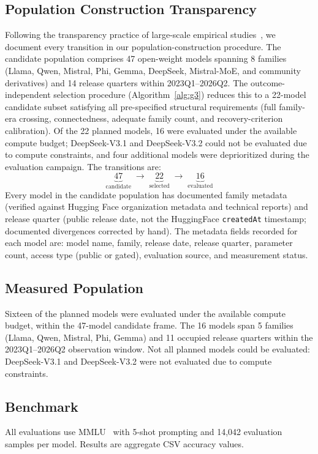 \documentclass{ieeeaccess}
\theoremstyle{definition}
\theoremstyle{plain}
\begin{document}
\subsection{Population Construction Transparency}
Following the transparency practice of large-scale empirical studies~\cite{kim2025}, we document every transition in our population-construction procedure. The candidate population comprises 47 open-weight models spanning 8 families (Llama, Qwen, Mistral, Phi, Gemma, DeepSeek, Mistral-MoE, and community derivatives) and 14 release quarters within 2023Q1--2026Q2. The outcome-independent selection procedure (Algorithm~\ref{alg:g3}) reduces this to a 22-model candidate subset satisfying all pre-specified structural requirements (full family-era crossing, connectedness, adequate family count, and recovery-criterion calibration). Of the 22 planned models, 16 were evaluated under the available compute budget; DeepSeek-V3.1 and DeepSeek-V3.2 could not be evaluated due to compute constraints, and four additional models were deprioritized during the evaluation campaign. The transitions are:
\[
\underbrace{47}_{\text{candidate}} \;\longrightarrow\; \underbrace{22}_{\text{selected}} \;\longrightarrow\; \underbrace{16}_{\text{evaluated}}
\]
Every model in the candidate population has documented family metadata (verified against Hugging Face organization metadata and technical reports) and release quarter (public release date, not the HuggingFace \texttt{createdAt} timestamp; documented divergences corrected by hand). The metadata fields recorded for each model are: model name, family, release date, release quarter, parameter count, access type (public or gated), evaluation source, and measurement status.

\subsection{Measured Population}
Sixteen of the planned models were evaluated under the available compute budget, within the 47-model candidate frame. The 16 models span 5 families (Llama, Qwen, Mistral, Phi, Gemma) and 11 occupied release quarters within the 2023Q1--2026Q2 observation window. Not all planned models could be evaluated: DeepSeek-V3.1 and DeepSeek-V3.2 were not evaluated due to compute constraints.

\subsection{Benchmark}
All evaluations use MMLU~\cite{hendrycks2021} with 5-shot prompting and 14,042 evaluation samples per model. Results are aggregate CSV accuracy values.
\end{document}

